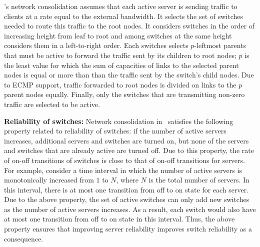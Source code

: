 
\shrink's network consolidation assumes that each active server is sending traffic to clients at a rate equal to the external bandwidth. It selects the set of switches needed to route this traffic to the root nodes. It considers switches in the order of increasing height from leaf to root and among switches at the same height considers them in a left-to-right order. Each switches selects $p$-leftmost parents that must be active to forward the traffic sent by its children to root nodes; $p$ is the least value for which the sum of capacities of links to the selected parent nodes is equal or more than than the traffic sent by the switch's child nodes. Due to ECMP support, traffic forwarded to root nodes is divided on links to the $p$ parent nodes equally.
Finally, only the switches that are transmitting non-zero traffic are selected to be active.




\textbf{Reliability of switches:} Network consolidation in \shrink\ satisfies the following property related to reliability of switches: if the number of active servers increases, additional servers and switches are turned on, but none of the servers and switches that are already active are turned off. Due to this property,  the rate of on-off transitions of switches is close to that of on-off transitions for servers. For example, consider a time interval in which the number of active servers is monotonically increased from $1$ to $N$, where $N$ is the total number of servers. In this interval, there is at most one transition from off to on state for each server. Due to the above property, the set of active switches can only add new switches as the number of active servers increases. As a result, each switch would also have at most one transition from off to on state in this interval. Thus, the above property ensures that improving server reliability improves switch reliability as a consequence.

